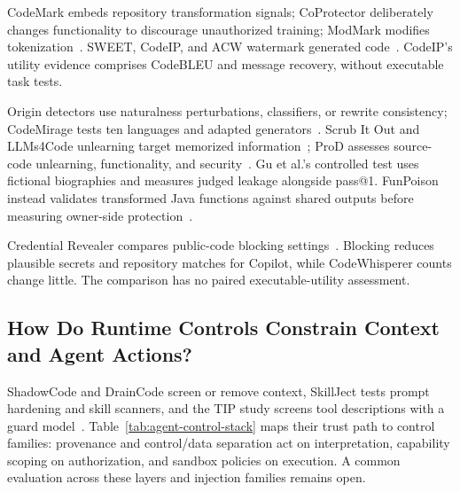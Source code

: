 \documentclass[acmsmall,screen,review,nonacm]{acmart}
\begin{document}
CodeMark embeds repository transformation signals; CoProtector deliberately changes functionality to discourage unauthorized training; ModMark modifies tokenization~\cite{codemark2023,coprotector2022,zhang2024modmark}. SWEET, CodeIP, and ACW watermark generated code~\cite{lee2024sweet,guan2024codeip,li2024acw}. CodeIP's utility evidence comprises CodeBLEU and message recovery, without executable task tests.

Origin detectors use naturalness perturbations, classifiers, or rewrite consistency; CodeMirage tests ten languages and adapted generators~\cite{shi2025betweenlines,nguyen2024gptsniffer,ye2025uncovering,guo2025codemirage}. Scrub It Out and LLMs4Code unlearning target memorized information~\cite{chu2026scrubitout,gu2026unlearning}; ProD assesses source-code unlearning, functionality, and security~\cite{jiang2025prod}. Gu et al.'s controlled test uses fictional biographies and measures judged leakage alongside pass@1. FunPoison instead validates transformed Java functions against shared outputs before measuring owner-side protection~\cite{xiao2026funpoison}.

Credential Revealer compares public-code blocking settings~\cite{huang2024secret}. Blocking reduces plausible secrets and repository matches for Copilot, while CodeWhisperer counts change little. The comparison has no paired executable-utility assessment.

\subsection{How Do Runtime Controls Constrain Context and Agent Actions?}
ShadowCode and DrainCode screen or remove context, SkillJect tests prompt hardening and skill scanners, and the TIP study screens tool descriptions with a guard model~\cite{shadowcode2024,wang2025draincode,skillject2026,xie2025redteaming}. Table~\ref{tab:agent-control-stack} maps their trust path to control families: provenance and control/data separation act on interpretation, capability scoping on authorization, and sandbox policies on execution. A common evaluation across these layers and injection families remains open.
\end{document}
